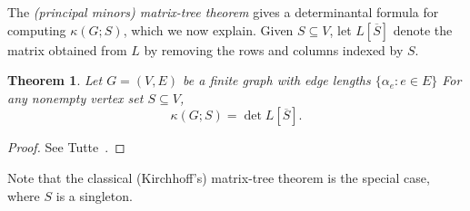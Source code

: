 \documentclass[12pt]{amsart}
\newtheorem{thm}{Theorem}[section]
\theoremstyle{definition}
\newcommand{\La}{L}
\newcommand{\trees}{\mathcal{F}_1}
\newcommand\farbod[1]{\footnote{[\textcolor{orange}{(Farbod)} \textcolor{blue}{#1}]}}
\begin{document}


The {\em (principal minors) matrix-tree theorem} gives a determinantal formula for computing $\kappa(G;S)$, which we now explain. 
Given $S \subseteq V$, let $L[\overline S]$ denote the matrix obtained from $L$ by removing the rows and columns indexed by $S$.


\begin{thm}
\label{thm:matrix-tree}
Let $G = (V,E)$ be a finite graph with edge lengths $\{ \alpha_e \colon e \in E\}$
%
For any nonempty vertex set $S \subseteq V$,
\begin{equation}
	\kappa( G ; S) = \det L[\overline S] .
\end{equation}
\end{thm}
\begin{proof}
See Tutte~\cite[Section VI.6, Equation (VI.6.7)]{tutte}.%
\end{proof}
Note that the classical (Kirchhoff's) matrix-tree theorem is the special case, where $S$ is a singleton.
\end{document}
